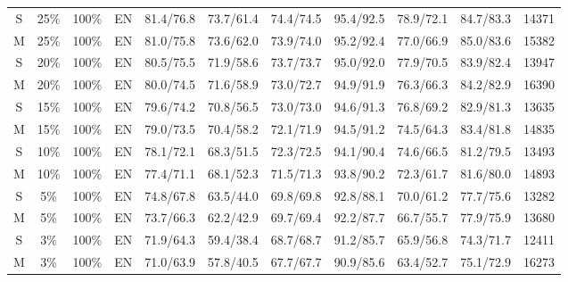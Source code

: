 \begin{table*}
{\begin{tabular}{|c|c|c|c||c|c|c|c|c|c||c|}
 S  &  25\%  &  100\%  &  EN  & 81.4/76.8 & 73.7/61.4 & 74.4/74.5 & 95.4/92.5 & 78.9/72.1 & 84.7/83.3 & 14371 \\ 
 M  &  25\%  &  100\%  &  EN  & 81.0/75.8 & 73.6/62.0 & 73.9/74.0 & 95.2/92.4 & 77.0/66.9 & 85.0/83.6 & 15382 \\ \hline
 S  &  20\%  &  100\%  &  EN  & 80.5/75.5 & 71.9/58.6 & 73.7/73.7 & 95.0/92.0 & 77.9/70.5 & 83.9/82.4 & 13947 \\ 
 M  &  20\%  &  100\%  &  EN  & 80.0/74.5 & 71.6/58.9 & 73.0/72.7 & 94.9/91.9 & 76.3/66.3 & 84.2/82.9 & 16390 \\ \hline
 S  &  15\%  &  100\%  &  EN  & 79.6/74.2 & 70.8/56.5 & 73.0/73.0 & 94.6/91.3 & 76.8/69.2 & 82.9/81.3 & 13635 \\ 
 M  &  15\%  &  100\%  &  EN  & 79.0/73.5 & 70.4/58.2 & 72.1/71.9 & 94.5/91.2 & 74.5/64.3 & 83.4/81.8 & 14835 \\ \hline
 S  &  10\%  &  100\%  &  EN  & 78.1/72.1 & 68.3/51.5 & 72.3/72.5 & 94.1/90.4 & 74.6/66.5 & 81.2/79.5 & 13493 \\ 
 M  &  10\%  &  100\%  &  EN  & 77.4/71.1 & 68.1/52.3 & 71.5/71.3 & 93.8/90.2 & 72.3/61.7 & 81.6/80.0 & 14893 \\ \hline
 S  &  5\%  &  100\%  &  EN  & 74.8/67.8 & 63.5/44.0 & 69.8/69.8 & 92.8/88.1 & 70.0/61.2 & 77.7/75.6 & 13282 \\ 
 M  &  5\%  &  100\%  &  EN  & 73.7/66.3 & 62.2/42.9 & 69.7/69.4 & 92.2/87.7 & 66.7/55.7 & 77.9/75.9 & 13680 \\ \hline
 S  &  3\%  &  100\%  &  EN  & 71.9/64.3 & 59.4/38.4 & 68.7/68.7 & 91.2/85.7 & 65.9/56.8 & 74.3/71.7 & 12411 \\ 
 M  &  3\%  &  100\%  &  EN  & 71.0/63.9 & 57.8/40.5 & 67.7/67.7 & 90.9/85.6 & 63.4/52.7 & 75.1/72.9 & 16273 \\ \hline

\end{tabular}
}
\end{table*}

